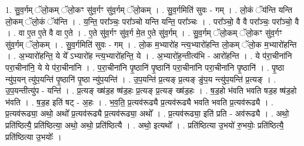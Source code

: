 \documentclass[17pt]{extarticle}
\begin{document}
1. सु॒व॒र्गम् ॅलो॒कम् ॅलो॒कꣳ सु॑व॒र्गꣳ सु॑व॒र्गम् ॅलो॒कम् । . सु॒व॒र्गमिति॑ सुवः - गम् । . लो॒कं ॅय॑न्ति यन्ति लो॒कम् ॅलो॒कं ॅय॑न्ति । . य॒न्ति॒ परा᳚ञ्चः॒ परा᳚ञ्चो यन्ति यन्ति॒ परा᳚ञ्चः । . परा᳚ञ्चो॒ वै वै परा᳚ञ्चः॒ परा᳚ञ्चो॒ वै । . वा ए॒त ए॒ते वै वा ए॒ते । . ए॒ते सु॑व॒र्गꣳ सु॑व॒र्ग मे॒त ए॒ते सु॑व॒र्गम् । . सु॒व॒र्गम् ॅलो॒कम् ॅलो॒कꣳ सु॑व॒र्गꣳ सु॑व॒र्गम् ॅलो॒कम् । . सु॒व॒र्गमिति॑ सुवः - गम् । . लो॒क म॒भ्यारो॑ह न्त्य॒भ्यारो॑हन्ति लो॒कम् ॅलो॒क म॒भ्यारो॑हन्ति । . अ॒भ्यारो॑हन्ति॒ ये ये᳚ ऽभ्यारो॑ह न्त्य॒भ्यारो॑हन्ति॒ ये । . अ॒भ्यारो॑ह॒न्तीत्य॑भि - आरो॑हन्ति । . ये प॑रा॒चीना॑नि परा॒चीना॑नि॒ ये ये प॑रा॒चीना॑नि । . प॒रा॒चीना॑नि पृ॒ष्ठानि॑ पृ॒ष्ठानि॑ परा॒चीना॑नि परा॒चीना॑नि पृ॒ष्ठानि॑ । . पृ॒ष्ठा न्यु॑प॒यन् त्यु॑प॒यन्ति॑ पृ॒ष्ठानि॑ पृ॒ष्ठा न्यु॑प॒यन्ति॑ । . उ॒प॒यन्ति॑ प्र॒त्यङ् प्र॒त्यङ् ङु॑प॒य न्त्यु॑प॒यन्ति॑ प्र॒त्यङ् । . उ॒प॒यन्तीत्यु॑प - यन्ति॑ । . प्र॒त्यङ् ख्ष॑ड॒ह ष्ष॑ड॒हः प्र॒त्यङ् प्र॒त्यङ् ख्ष॑ड॒हः । . ष॒ड॒हो भ॑वति भवति षड॒ह ष्ष॑ड॒हो भ॑वति । . ष॒ड॒ह इति॑ षट् - अ॒हः । . भ॒व॒ति॒ प्र॒त्यव॑रूढ्यै प्र॒त्यव॑रूढ्यै भवति भवति प्र॒त्यव॑रूढ्यै । . प्र॒त्यव॑रूढ्या॒ अथो॒ अथो᳚ प्र॒त्यव॑रूढ्यै प्र॒त्यव॑रूढ्या॒ अथो᳚ । . प्र॒त्यव॑रूढ्या॒ इति॑ प्रति - अव॑रूढ्यै । . अथो॒ प्रति॑ष्ठित्यै॒ प्रति॑ष्ठित्या॒ अथो॒ अथो॒ प्रति॑ष्ठित्यै । . अथो॒ इत्यथो᳚ । . प्रति॑ष्ठित्या उ॒भयो॑ रु॒भयोः॒ प्रति॑ष्ठित्यै॒ प्रति॑ष्ठित्या उ॒भयोः᳚ । \newline
\end{document}
